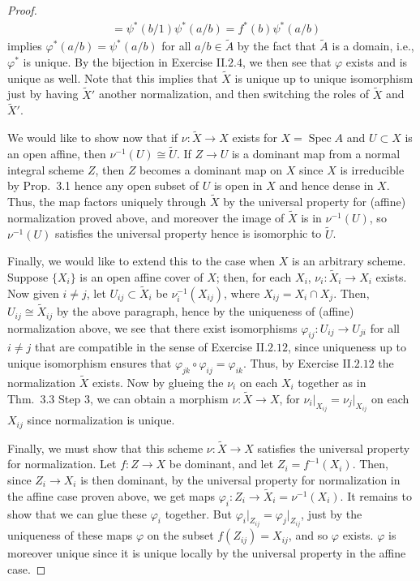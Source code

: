 \documentclass[10pt]{article}
\theoremstyle{definition}
\theoremstyle{remark}
\numberwithin{equation}{section}
\numberwithin{figure}{subsubsection}
\DeclareMathOperator{\Spec}{Spec}
\begin{document}
\begin{proof}
\begin{align*}
    &= \psi^*(b/1)\psi^*(a/b) = f^*(b)\psi^*(a/b)
  \end{align*}
  implies $\varphi^*(a/b) = \psi^*(a/b)$ for all $a/b \in \tilde{A}$ by the fact
  that $\tilde{A}$ is a domain, i.e., $\varphi^*$ is unique. By the bijection in
  Exercise II.$2.4$, we then see that $\varphi$ exists and is unique as well. Note that this implies that $\tilde{X}$ is unique up to unique isomorphism just by having $\tilde{X}'$ another normalization, and then switching the roles of $\tilde{X}$ and $\tilde{X}'$.
  \par We would like to show now that if $\nu\colon \tilde{X} \to X$ exists for
  $X = \Spec A$ and $U \subset X$ is an open affine, then $\nu^{-1}(U) \cong
  \tilde{U}$. If $Z \to U$ is a dominant map from a normal integral scheme $Z$,
  then $Z$ becomes a dominant map on $X$ since $X$ is irreducible by Prop.~3.1
  hence any open subset of $U$ is open in $X$ and hence dense in $X$. Thus, the
  map factors uniquely through $\tilde{X}$ by the universal property for
  (affine) normalization proved above, and moreover the image of $\tilde{X}$ is
  in $\nu^{-1}(U)$, so $\nu^{-1}(U)$ satisfies the universal property hence is
  isomorphic to $\tilde{U}$.
  \par Finally, we would like to extend this to the case when $X$ is an
  arbitrary scheme. Suppose $\{X_i\}$ is an open affine cover of $X$; then, for
  each $X_i$, $\nu_i\colon\tilde{X}_i \to X_i$ exists. Now given $i \ne j$, let
  $U_{ij} \subset \tilde{X}_i$ be $\nu_i^{-1}(X_{ij})$, where $X_{ij} = X_i \cap
  X_j$. Then, $U_{ij} \cong \tilde{X}_{ij}$ by the above paragraph, hence by the
  uniqueness of (affine) normalization above, we see that there exist
  isomorphisms $\varphi_{ij}\colon U_{ij} \to U_{ji}$ for all $i \ne j$ that are
  compatible in the sense of Exercise II.$2.12$, since uniqueness up to unique
  isomorphism ensures that $\varphi_{jk} \circ \varphi_{ij} = \varphi_{ik}$.
  Thus, by Exercise II.$2.12$ the normalization $\tilde{X}$ exists. Now by
  glueing the $\nu_i$ on each $X_i$ together as in Thm.~3.3 Step 3, we can
  obtain a morphism $\nu\colon \tilde{X} \to X$, for $\nu_i\vert_{X_{ij}} =
  \nu_j\vert_{X_{ij}}$ on each $X_{ij}$ since normalization is unique.
  \par Finally, we must show that this scheme $\nu\colon\tilde{X} \to X$ satisfies the universal property for normalization. Let $f \colon Z \to X$ be dominant, and let $Z_i = f^{-1}(X_i)$. Then, since $Z_i \to X_i$ is then dominant, by the universal property for normalization in the affine case proven above, we get maps $\varphi_i\colon Z_i \to \tilde{X}_i = \nu^{-1}(X_i)$. It remains to show that we can glue these $\varphi_i$ together. But $\varphi_i\vert_{Z_{ij}} = \varphi_j\vert_{Z_{ij}}$, just by the uniqueness of these maps $\varphi$ on the subset $f(Z_{ij}) = X_{ij}$, and so $\varphi$ exists. $\varphi$ is moreover unique since it is unique locally by the universal property in the affine case.

\end{proof}
\end{document}
